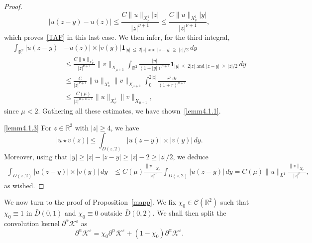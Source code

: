 \documentclass[10pt]{amsart}
\theoremstyle{definition}\newtheorem{defi}[theo]{Definition}\newtheorem{rema}[theo]{Remark}\newtheorem{exam}[theo]{Example}\newtheorem{exem}[theo]{Example}\newtheorem{nota}[theo]{Notation}
\newcommand*\p{\partial}
\newcommand*\R{\mathbb R}
\newcommand*\BC{\mathcal{C}}
\newcommand*\BK{\mathcal{K}}
\newcommand{\bfun}{\mathbf{1}}
\newcommand*\gs{\geqslant }
\newcommand*\ls{\leqslant }
\newcommand*\e{\varepsilon}
\begin{document}
\begin{proof}
\[
\lvert u (z-y) - u (z) \rvert
\ls \frac{C \| u \|_{X^1_\nu} |z|}{ |z|^{\nu+1} }
\ls \frac{C \| u \|_{X^1_\nu} |y|}{ |z|^{\nu+1} },
\]
which proves~\eqref{TAF} in this last case. We then infer, for the third integral,
\begin{align*}
\int_{\R^2} \lvert u (z-y) & - u (z) \rvert \times \lvert v(y) \rvert \bfun_{|y|\,\ls\,2 |z| \text{ and } |z-y|\,\gs\,|z| /2 } \, dy
\\
& \ls
\frac{C \| u \|_{X^1_\nu} }{|z|^{\nu+1}}
\| v \|_{X_{\mu+1} } \int_{\R^2} \frac{ |y|}{ (1 + |y|)^{\mu+1} } \bfun_{|y|\,\ls\,2 |z| \text{ and } |z-y|\,\gs\,|z| /2 } \, dy
\\
& \ls
\frac{C}{|z|^{\nu +1}} \| u \|_{X^1_\nu} \| v \|_{X_{\mu+1} }
\int_0^{2|z|} \frac{ r^2 \, dr}{ (1 + r)^{\mu+1} }
\\
& \ls
\frac{C(\mu)}{|z|^{\mu + \nu-1 }} \| u \|_{X^1_\nu} \| v \|_{X_{\mu+1} },
\end{align*}
since $ \mu < 2 $. Gathering all these estimates, we have shown~\eqref{lemm4.1.1}.

\noindent\eqref{lemm4.1.3} For $ z \in \R^2 $ with $ |z| \gs 4 $, we have
\[
\lvert u \star v (z) \rvert
\ls \int_{D(z,2)} \lvert u (z-y) \rvert \times \lvert v (y) \rvert \, dy.
\]
Moreover, using that $ |y| \gs |z| - |z-y| \gs |z| - 2 \gs |z|/2 $, we deduce
\begin{align*}
\int_{D(z,2) } \lvert u (z-y) \rvert \times \lvert v(y) \rvert \, dy & \ls C(\mu)
\frac{ \| v \|_{X_{\mu}} }{ \lvert z \rvert^{\mu } }
\int_{D(z,2)} \lvert u (z-y) \rvert \, dy = C(\mu) \| u \|_{L^1 }
\frac{ \| v \|_{X_{\mu}} }{ \lvert z \rvert^{\mu } },
\end{align*}
as wished.
\end{proof}



We now turn to the proof of Proposition~\ref{mapp}. We fix $ \chi_0 \in \BC (\R^2) $ such that $ \chi_0 \equiv 1 $ in $ \bar{D}(0,1) $ and $ \chi_0 \equiv 0 $ outside $ \bar{D}(0,2) $. We shall then split the convolution kernel $ \p^\alpha \BK^\e $ as
\[
\p^\alpha \BK^\e = \chi_0 \p^\alpha \BK^\e + (1 - \chi_0) \p^\alpha \BK^\e.
\]
\end{document}
